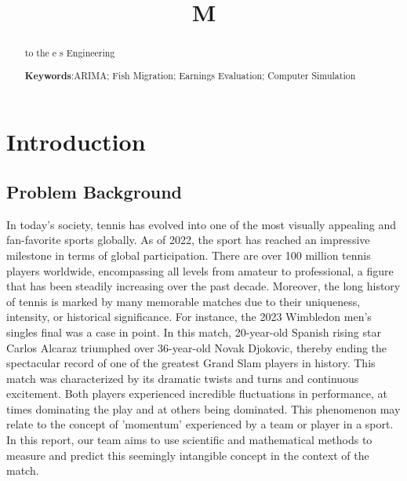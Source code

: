 \documentclass[12pt]{article}  %
\title{M}  %
\begin{document}
\begin{abstract}
    
 to the e s Engineering

    \vspace{5pt}  %
    \textbf{Keywords}:ARIMA; Fish Migration; Earnings Evaluation; Computer Simulation

\end{abstract}

\maketitle  %

\tableofcontents  %


\section{Introduction}

\subsection{Problem Background}
In today's society, tennis has evolved into one of the most visually appealing and fan-favorite sports globally. 
As of 2022, the sport has reached an impressive milestone in terms of global participation. 
There are over 100 million tennis players worldwide, encompassing all levels from amateur to professional, 
a figure that has been steadily increasing over the past decade.
Moreover, the long history of tennis is marked by many memorable matches due to their uniqueness, intensity, 
or historical significance. For instance, the 2023 Wimbledon men's singles final was a case in point. 
In this match, 20-year-old Spanish rising star Carlos Alcaraz triumphed over 36-year-old Novak Djokovic, 
thereby ending the spectacular record of one of the greatest Grand Slam players in history. 
This match was characterized by its dramatic twists and turns and continuous excitement. 
Both players experienced incredible fluctuations in performance, at times dominating the play and at others being dominated. 
This phenomenon may relate to the concept of 'momentum' experienced by a team or player in a sport. In this report, 
our team aims to use scientific and mathematical methods to measure and predict this seemingly intangible concept in the context of the match.
\end{document}

